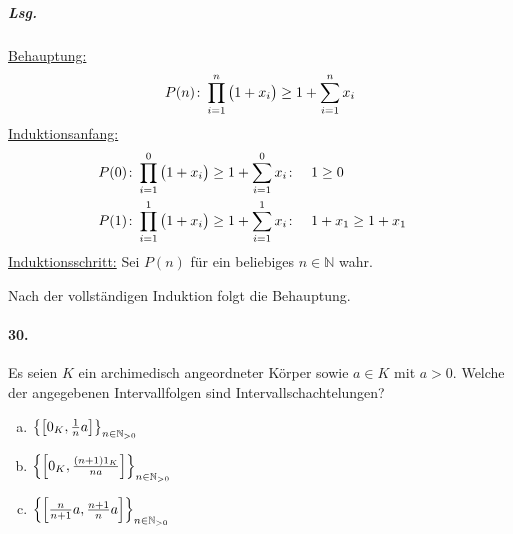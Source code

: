 \documentclass{scrreprt}
\begin{document}
\subparagraph{Lsg.}
\underline{Behauptung:}
\[
  P(n) \colon \prod_{i = 1}^n \qty\big(1 + x_i) \geq 1 + \sum_{i = 1}^n x_i
\]
\underline{Induktionsanfang:}
\begin{align*}
  P(0) &\colon \prod_{i = 1}^0 \qty\big(1 + x_i) \geq 1 + \sum_{i = 1}^0 x_i
       \colon && 1 \geq 0 && \\
  P(1) &\colon \prod_{i = 1}^1 \qty\big(1 + x_i) \geq 1 + \sum_{i = 1}^1 x_i
       \colon && 1 + x_1 \geq 1 + x_1
\end{align*}
\underline{Induktionsschritt:} Sei $P(n)$ für ein beliebiges $n \in \mathbb{N}$
wahr.

Nach der vollständigen Induktion folgt die Behauptung.

\paragraph{30.} Es seien $K$ ein archimedisch angeordneter Körper sowie
$a \in K$ mit $a > 0$.
Welche der angegebenen Intervallfolgen sind Intervallschachtelungen?
\begin{enumerate}[(a)]
\item $\qty{\qty[0_K, \frac{1}{n}a]}_{n \in \mathbb{N}_{>0}}$
\item $\qty{\qty[0_K, \frac{(n + 1) 1_K}{na}]}_{n \in \mathbb{N}_{>0}}$
\item $\qty{\qty[\frac{n}{n + 1}a, \frac{n + 1}{n} a]}_{n \in \mathbb{N}_{>0}}$
\end{enumerate}
\end{document}
